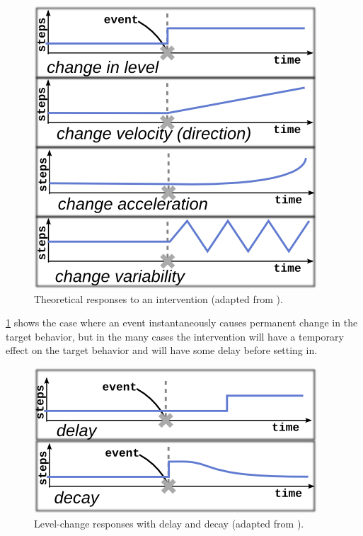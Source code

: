 \documentclass[preprint,journal]{vgtc}       %
\begin{document}
\begin{figure}
\centering
\includegraphics[width=0.9\columnwidth]{./img/exampleDynamicSignals.png}
\caption{Theoretical responses to an intervention (adapted from \cite{glass1975}).}
\label{fig:exampleSignals}
\end{figure}

\ref{fig:exampleSignals} shows the case where an event instantaneously causes permanent change in the target behavior, but in the many cases the intervention will have a temporary effect on the target behavior and will have some delay before setting in. 

\begin{figure}
\centering
\includegraphics[width=0.9\columnwidth]{./img/exampleDynamicComplications.png}
\caption{Level-change responses with delay and decay (adapted from \cite{glass1975}).}
\label{fig:exampleComplications}
\end{figure}
\end{document}
